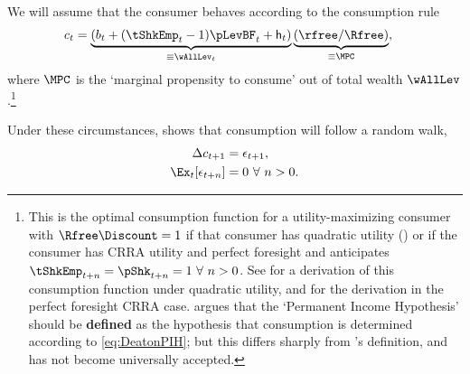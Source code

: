 \documentclass{handout}
\begin{document}
We will assume that the consumer behaves according to the consumption rule
\begin{equation}\begin{gathered}\begin{aligned}
  \cLev_{t} & =  \underbrace{(\bLev_{t}+(\tShkEmp_{t}-1)\pLevBF_{t}+\hLev_{t})}_{\equiv \wAllLev_{t}}\underbrace{(\rfree/\Rfree)}_{\equiv \MPC}, \label{eq:DeatonPIH}
\end{aligned}\end{gathered}\end{equation}
where $\MPC$ is the `marginal propensity to consume' out of total wealth $\wAllLev$.\footnote{This is the optimal consumption function for a utility-maximizing consumer with $\Rfree \Discount = 1$ if that consumer has quadratic utility (\cite{hallRandomWalk}) or if the consumer has CRRA utility and perfect foresight and anticipates $\tShkEmp_{t+n}=\pShk_{t+n}=1~\forall~n>0$.  See  for a derivation of this consumption function under quadratic utility, and  for the derivation in the perfect foresight CRRA case.  \cite{deatonUnderstandingC} argues that the `Permanent Income Hypothesis' should be {\bf defined} as the hypothesis that consumption is determined according to \eqref{eq:DeatonPIH}; but this differs sharply from \cite{friedmanATheory}'s definition, and has not become universally accepted.}

Under these circumstances,  shows that 
consumption will follow a random walk,
\begin{equation}\begin{gathered}\begin{aligned}
\Delta \cLev_{t+1} & =  \error_{t+1}, \label{eq:rwc}
\\ \Ex_{t}[\error_{t+n}] & =  0 ~\forall~n>0.
\end{aligned}\end{gathered}\end{equation}
\end{document}
